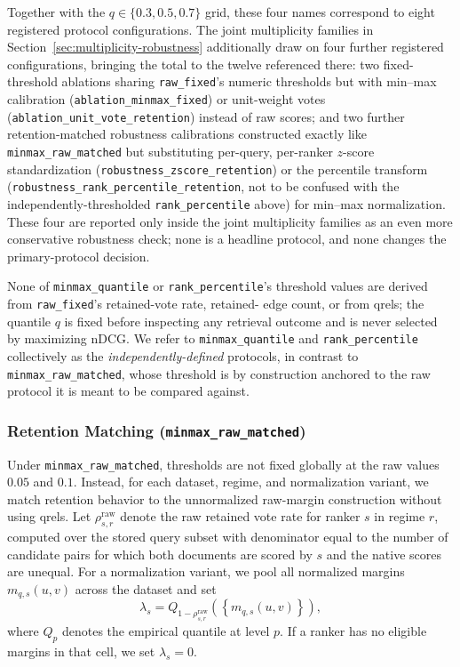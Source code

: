 \documentclass[manuscript,anonymous,review]{acmart}
\begin{document}
Together with the $q\in\{0.3,0.5,0.7\}$ grid, these four names correspond to
eight registered protocol configurations. The joint multiplicity families in
Section~\ref{sec:multiplicity-robustness} additionally draw on four further
registered configurations, bringing the total to the twelve referenced
there: two fixed-threshold ablations sharing \texttt{raw\_fixed}'s numeric
thresholds but with min--max calibration (\texttt{ablation\_minmax\_fixed})
or unit-weight votes (\texttt{ablation\_unit\_vote\_retention}) instead of
raw scores; and two further retention-matched robustness calibrations
constructed exactly like \texttt{minmax\_raw\_matched} but substituting
per-query, per-ranker $z$-score standardization
(\texttt{robustness\_zscore\_retention}) or the percentile transform
(\texttt{robustness\_rank\_percentile\_retention}, not to be confused with
the independently-thresholded \texttt{rank\_percentile} above) for min--max
normalization. These four are reported only inside the joint multiplicity
families as an even more conservative robustness check; none is a headline
protocol, and none changes the primary-protocol decision.

None of \texttt{minmax\_quantile} or \texttt{rank\_percentile}'s threshold
values are derived from \texttt{raw\_fixed}'s retained-vote rate, retained-
edge count, or from qrels; the quantile $q$ is fixed before inspecting any
retrieval outcome and is never selected by maximizing nDCG. We refer to
\texttt{minmax\_quantile} and \texttt{rank\_percentile} collectively as the
\emph{independently-defined} protocols, in contrast to
\texttt{minmax\_raw\_matched}, whose threshold is by construction anchored
to the raw protocol it is meant to be compared against.

\subsubsection{Retention Matching (\texttt{minmax\_raw\_matched})}
\label{sec:retention-matching}

Under \texttt{minmax\_raw\_matched}, thresholds are not fixed globally at the
raw values $0.05$ and $0.1$. Instead, for each dataset, regime, and
normalization variant, we match retention behavior to the unnormalized
raw-margin construction without using qrels. Let $\rho^{\mathrm{raw}}_{s,r}$
denote the raw retained vote rate for ranker $s$ in regime $r$, computed over
the stored query subset with denominator equal to the number of candidate
pairs for which both documents are scored by $s$ and the native scores are
unequal. For a normalization variant, we pool all normalized margins
$m_{q,s}(u,v)$ across the dataset and set
\begin{equation}
  \lambda_s = Q_{1-\rho^{\mathrm{raw}}_{s,r}}
  \left(\left\{m_{q,s}(u,v)\right\}\right),
  \label{eq:vote-threshold-match}
\end{equation}
where $Q_p$ denotes the empirical quantile at level $p$. If a ranker has no
eligible margins in that cell, we set $\lambda_s=0$.
\end{document}
